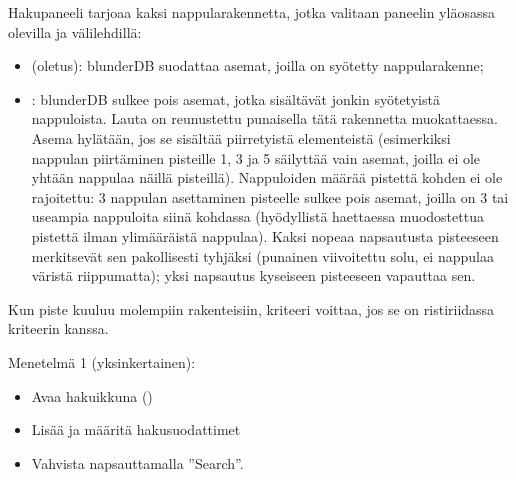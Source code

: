 \documentclass[letterpaper,10pt,finnish]{sphinxmanual}
\begin{document}
\sphinxAtStartPar
Hakupaneeli tarjoaa kaksi nappularakennetta, jotka valitaan paneelin yläosassa olevilla \sphinxhyphen{} ja \sphinxhyphen{}välilehdillä:
\begin{itemize}
\item {} 
\sphinxAtStartPar
{} (oletus): blunderDB suodattaa asemat, joilla on  syötetty nappularakenne;

\item {} 
\sphinxAtStartPar
{}: blunderDB sulkee pois asemat, jotka sisältävät jonkin syötetyistä nappuloista. Lauta on reunustettu punaisella tätä rakennetta muokattaessa. Asema hylätään, jos se sisältää  piirretyistä elementeistä (esimerkiksi nappulan piirtäminen pisteille 1, 3 ja 5 säilyttää vain asemat, joilla ei ole yhtään nappulaa näillä pisteillä). Nappuloiden määrää pistettä kohden ei ole rajoitettu: 3 nappulan asettaminen pisteelle sulkee pois asemat, joilla on 3 tai useampia nappuloita siinä kohdassa (hyödyllistä haettaessa muodostettua pistettä ilman ylimääräistä nappulaa). Kaksi nopeaa napsautusta pisteeseen merkitsevät sen pakollisesti tyhjäksi (punainen viivoitettu solu, ei nappulaa väristä riippumatta); yksi napsautus kyseiseen pisteeseen vapauttaa sen.

\end{itemize}

\sphinxAtStartPar
Kun piste kuuluu molempiin rakenteisiin, \sphinxhyphen{}kriteeri voittaa, jos se on ristiriidassa  \sphinxhyphen{}kriteerin kanssa.

\sphinxAtStartPar
Menetelmä 1 (yksinkertainen):
\begin{itemize}
\item {} 
\sphinxAtStartPar
Avaa hakuikkuna ()

\item {} 
\sphinxAtStartPar
Lisää ja määritä hakusuodattimet

\item {} 
\sphinxAtStartPar
Vahvista napsauttamalla ”Search”.

\end{itemize}
\end{document}
